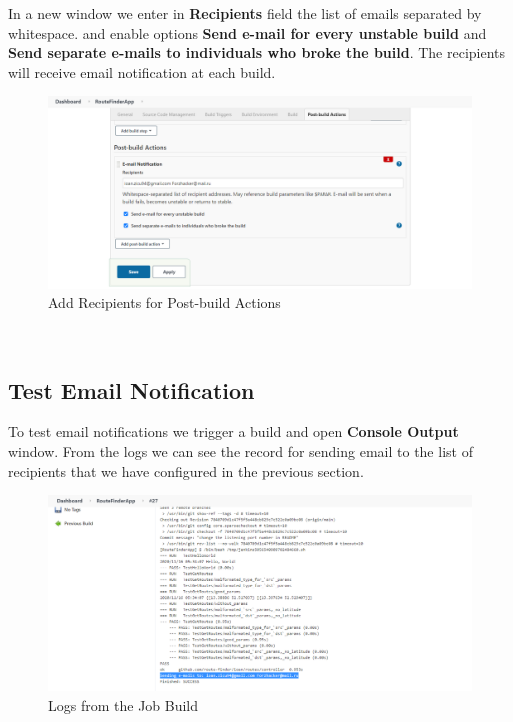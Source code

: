 \documentclass[12pt,a4paper,twoside]{article}
\begin{document}
In a new window we enter in \textbf{Recipients} field the list of emails separated by whitespace. and enable options \textbf{Send e-mail for every unstable build} and \textbf{Send separate e-mails to individuals who broke the build}.
The recipients will receive email notification at each build.


\begin{figure}[H]
    \centering
        \includegraphics[width=15cm]{images-aws/56-email-notification-post-build-action.png}
        \caption{Add Recipients for Post-build Actions}
\end{figure}




~\newpage


\subsection{Test Email Notification}


To test email notifications we trigger a build and open \textbf{Console Output} window. From the logs we can see the record for sending email to the list of recipients that we have configured in the previous section.


\begin{figure}[H]
    \centering
        \includegraphics[width=15cm]{images-aws/57-email-notification-trigger-build.png}
        \caption{Logs from the Job Build}
\end{figure}
\end{document}
